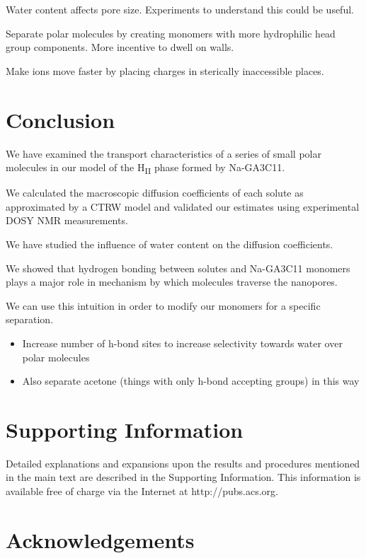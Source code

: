 \documentclass{article}
\begin{document}
  Water content affects pore size. Experiments to understand this could be useful.

  Separate polar molecules by creating monomers with more hydrophilic head group components.
  More incentive to dwell on walls.

  Make ions move faster by placing charges in sterically inaccessible places. 

  \section{Conclusion}

  We have examined the transport characteristics of a series of small polar
  molecules in our model of the H\textsubscript{II} phase formed by 
  Na-GA3C11.

  We calculated the macroscopic diffusion coefficients of each solute as 
  approximated by a CTRW model and validated our estimates using experimental
  DOSY NMR measurements.

  We have studied the influence of water content on the diffusion coefficients.

  We showed that hydrogen bonding between solutes and Na-GA3C11 monomers plays
  a major role in mechanism by which molecules traverse the nanopores. 

  We can use this intuition in order to modify our monomers for a specific 
  separation.
  \begin{itemize}
	\item Increase number of h-bond sites to increase selectivity towards water 
	over polar molecules
	\item Also separate acetone (things with only h-bond accepting groups) in this way
  \end{itemize}
  
 
  \section*{Supporting Information}

  Detailed explanations and expansions upon the results and procedures mentioned in
  the main text are described in the Supporting Information. This information is
  available free of charge via the Internet at http://pubs.acs.org.

  \section*{Acknowledgements}
\end{document}
